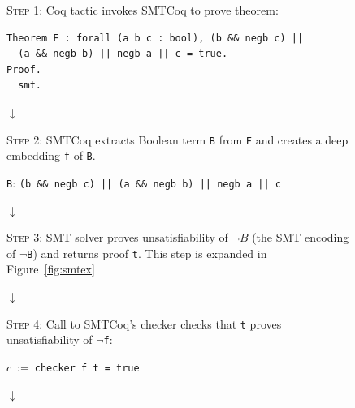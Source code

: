 \documentclass[11pt]{article}
\begin{document}
	\begin{figure}
		\begin{framed}
			\textsc{Step 1}: Coq tactic invokes SMTCoq
			to prove theorem:
			\begin{verbatim}
Theorem F : forall (a b c : bool), (b && negb c) || 
  (a && negb b) || negb a || c = true.
Proof.
  smt.
			\end{verbatim}
		\end{framed}
		\vspace{-0.3in}
		\begin{center}
			$\downarrow$
		\end{center}
		\vspace{-0.3in}
		\begin{framed}
			\textsc{Step 2}: SMTCoq extracts Boolean 
			term \texttt{B} from \texttt{F} and creates a deep 
			embedding \texttt{f} of \texttt{B}.
			\begin{center}
				\texttt{B}: \texttt{(b \&\& negb c) || 
				(a \&\& negb b) || negb a || c}
			\end{center}
		\end{framed}
		\vspace{-0.3in}
		\begin{center}
			$\downarrow$
		\end{center}
		\vspace{-0.3in}
		\begin{framed}
			\textsc{Step 3}: SMT solver 
			proves unsatisfiability of $\neg B$ 
			(the SMT encoding of $\neg$\texttt{B}) 
			and returns proof \texttt{t}. This step 
			is expanded in Figure~\ref{fig:smtex}
		\end{framed}
		\vspace{-0.3in}
		\begin{center}
			$\downarrow$
		\end{center}
		\vspace{-0.3in}
		\begin{framed}
			\textsc{Step 4}: Call to SMTCoq's 
			checker checks that \texttt{t}
			proves unsatisfiability of 
			\texttt{$\neg$f}:
			\begin{center}
				$c\ :=\ $\texttt{checker f t = true}
			\end{center}
		\end{framed}
		\vspace{-0.3in}
		\begin{center}
			$\downarrow$
		\end{center}
		\vspace{-0.3in}
		\begin{framed}

\end{framed}
\end{figure}
\end{document}
